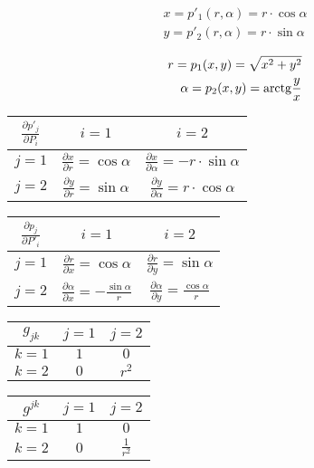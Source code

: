 \begin{equation}
\begin{split}
x = p'_1(r, \alpha) = r \cdot \cos \alpha \\
y = p'_2(r, \alpha) = r \cdot \sin \alpha
\end{split}
\end{equation}

\begin{equation}
\begin{split}
r = p_1(x, y) = \sqrt{x^2 + y^2} \\
\alpha = p_2(x, y) = \mathrm{arctg} \frac{y}{x}
\end{split}
\end{equation}

\begin{tabular}{| c || c | c |}
\hline
\(\frac{\partial p'_j}{\partial P_i}\) & \(i=1\) & \(i=2\) \\
\hline
\hline
\(j=1\) & \(\frac{\partial x}{\partial r} = \cos \alpha\) & \(\frac{\partial x}{\partial \alpha} = -r \cdot \sin \alpha\) \\
\hline
\(j=2\) & \(\frac{\partial y}{\partial r} = \sin \alpha\) & \(\frac{\partial y}{\partial \alpha} = r \cdot \cos \alpha\) \\
\hline
\end{tabular}

\begin{tabular}{| c || c | c |}
\hline
\(\frac{\partial p_j}{\partial P'_i}\) & \(i=1\) & \(i=2\) \\
\hline
\hline
\(j=1\) & \(\frac{\partial r}{\partial x} = \cos \alpha\) & \(\frac{\partial r}{\partial y} = \sin \alpha\) \\
\hline
\(j=2\) & \(\frac{\partial \alpha}{\partial x} = -\frac{\sin \alpha}{r}\) & \(\frac{\partial \alpha}{\partial y} = \frac{\cos \alpha}{r}\) \\
\hline
\end{tabular}

\begin{tabular}{| c || c | c |}
\hline
\(g_{jk}\) & \(j=1\) & \(j=2\) \\
\hline
\hline
\(k=1\) & \(1\) & \(0\) \\
\hline
\(k=2\) & \(0\) & \(r^2\) \\
\hline
\end{tabular}

\begin{tabular}{| c || c | c |}
\hline
\(g^{jk}\) & \(j=1\) & \(j=2\) \\
\hline
\hline
\(k=1\) & \(1\) & \(0\) \\
\hline
\(k=2\) & \(0\) & \(\frac{1}{r^2}\) \\
\hline
\end{tabular}

